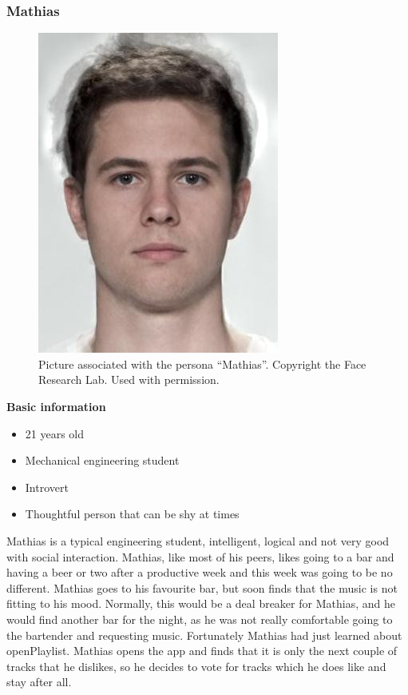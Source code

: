 \subsubsection{Mathias}
\begin{figure} [h]
  \centering
  \includegraphics[]{Images/mathias.jpg}
  \caption{Picture associated with the persona \enquote{Mathias}. Copyright the Face Research Lab. Used with permission.}
  \label{fig:mathias}
\end{figure}
\noindent\textbf{Basic information}
\begin{itemize}
\item 21 years old
\item Mechanical engineering student
\item Introvert
\item Thoughtful person that can be shy at times
\end{itemize}

Mathias is a typical engineering student, intelligent, logical and not very good with social interaction. Mathias, like most of his peers, likes going to a bar and having a beer or two after a productive week and this week was going to be no different. Mathias goes to his favourite bar, but soon finds that the music is not fitting to his mood. Normally, this would be a deal breaker for Mathias, and he would find another bar for the night, as he was not really comfortable going to the bartender and requesting music. Fortunately Mathias had just learned about openPlaylist. Mathias opens the app and finds that it is only the next couple of tracks that he dislikes, so he decides to vote for tracks which he does like and stay after all.